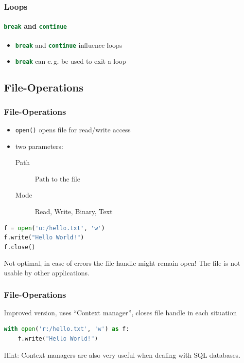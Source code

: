\documentclass[english]{beamer}
\newcommand{\ta}[1]{\textattachfile[color=1 0 0]{#1}{Code}}
\begin{document}
\begin{frame}[containsverbatim]
\frametitle{Loops}
\framesubtitle{\lstinline[language={Python}]{break} and \lstinline[language={Python}]{continue}}

\begin{itemize}
\item \lstinline[language={Python}]{break} and \lstinline[language={Python}]{continue} influence loops
\item \lstinline[language={Python}]{break} can e.\,g. be used to exit a loop 
\end{itemize}



\end{frame}


\subsection{File-Operations}

\begin{frame}[containsverbatim]
\frametitle{File-Operations}

\begin{itemize}
\item \texttt{open()} opens file for read/write access
\item two parameters:

\begin{description}
\item[Path] Path to the file
\item[Mode] Read, Write, Binary, Text
\end{description}
\end{itemize}

\begin{lstlisting}[language=Python,caption={Simple example for \texttt{write()}}]
f = open('u:/hello.txt', 'w')
f.write("Hello World!")
f.close()
\end{lstlisting}

Not optimal, in case of errors the file-handle might remain open! The file is not usable by other applications.
\end{frame}


\begin{frame}[containsverbatim]
\frametitle{File-Operations}

Improved version, uses \enquote{Context manager}, closes file handle in each situation

\begin{lstlisting}[language=Python,caption={Improved example for \texttt{write()}}]
with open('r:/hello.txt', 'w') as f:
    f.write("Hello World!")
\end{lstlisting}

Hint: Context managers are also very useful when dealing with SQL databases.

\end{frame}
\end{document}
